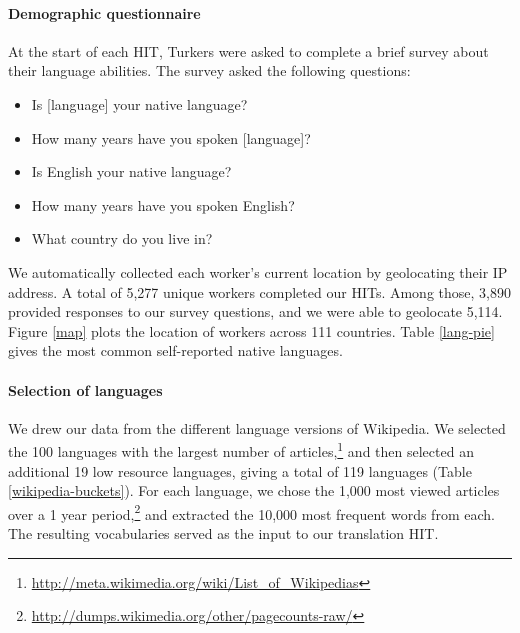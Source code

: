 \documentclass[11pt]{article}
\begin{document}
\paragraph{Demographic questionnaire}

At the start of each HIT, Turkers were asked to complete a brief survey about their language abilities. The survey asked the following questions:
\begin{itemize}
\item Is [language] your native language? 
\item How many years have you spoken [language]? 
\item Is English your native language? 
\item How many years have you spoken English?
\item What country do you live in?
\end{itemize}
We automatically collected each worker's current location by geolocating their IP address.  A total of 5,277 unique workers completed our HITs.  Among those, 3,890 provided responses to our survey questions, and we were able to geolocate 5,114.  Figure \ref{map} plots the location of workers across 111 countries.  Table \ref{lang-pie} gives the most common self-reported native languages. 

\paragraph{Selection of languages}

We drew our data from the different language versions of Wikipedia.   We selected the 100 languages with the largest number of articles,\footnote{\url{http://meta.wikimedia.org/wiki/List_of_Wikipedias}} and then selected an additional 19 low resource languages, giving a total of 119 languages (Table \ref{wikipedia-buckets}). For each language, we chose the 1,000 most viewed articles over a 1 year period,\footnote{\url{http://dumps.wikimedia.org/other/pagecounts-raw/}} and extracted the 10,000 most frequent words from each. The resulting vocabularies served as the input to our translation HIT.
\end{document}
